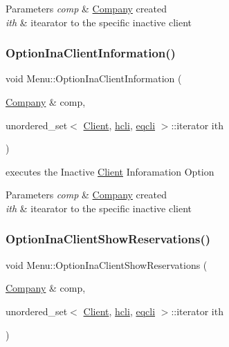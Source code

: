 \begin{DoxyParams}{Parameters}
{\em comp} & \hyperlink{class_company}{Company} created\\
\hline
{\em ith} & itearator to the specific inactive client \\
\hline
\end{DoxyParams}
\hypertarget{class_menu_a00dee88baecc198ca488a394e7c1d8b7}{}\label{class_menu_a00dee88baecc198ca488a394e7c1d8b7} 
\subsubsection{\texorpdfstring{Option\+Ina\+Client\+Information()}{OptionInaClientInformation()}}
{\footnotesize\ttfamily void Menu\+::\+Option\+Ina\+Client\+Information (\begin{DoxyParamCaption}\item[{\hyperlink{class_company}{Company} \&}]{comp,  }\item[{unordered\+\_\+set$<$ \hyperlink{class_client}{Client}, \hyperlink{structhcli}{hcli}, \hyperlink{structeqcli}{eqcli} $>$\+::iterator}]{ith }\end{DoxyParamCaption})}



executes the Inactive \hyperlink{class_client}{Client} Inforamation Option 


\begin{DoxyParams}{Parameters}
{\em comp} & \hyperlink{class_company}{Company} created\\
\hline
{\em ith} & itearator to the specific inactive client \\
\hline
\end{DoxyParams}
\hypertarget{class_menu_afb3ef4ef2b6681ad50b1fcbb8893dc06}{}\label{class_menu_afb3ef4ef2b6681ad50b1fcbb8893dc06} 
\subsubsection{\texorpdfstring{Option\+Ina\+Client\+Show\+Reservations()}{OptionInaClientShowReservations()}}
{\footnotesize\ttfamily void Menu\+::\+Option\+Ina\+Client\+Show\+Reservations (\begin{DoxyParamCaption}\item[{\hyperlink{class_company}{Company} \&}]{comp,  }\item[{unordered\+\_\+set$<$ \hyperlink{class_client}{Client}, \hyperlink{structhcli}{hcli}, \hyperlink{structeqcli}{eqcli} $>$\+::iterator}]{ith }\end{DoxyParamCaption})}




